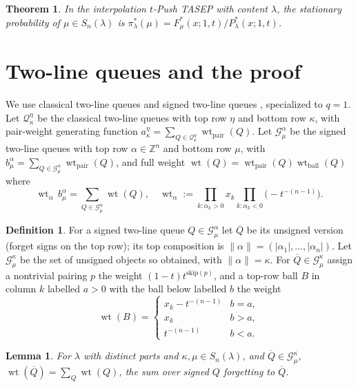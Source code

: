 \documentclass[11pt]{article}
\newcommand{\Z}{\mathbb{Z}}
\newcommand{\Snl}{S_n(\lambda)}
\newcommand{\wt}{\operatorname{wt}}
\newtheorem{theorem}{Theorem}
\newtheorem{lemma}{Lemma}
\theoremstyle{definition}
\newtheorem{definition}{Definition}
\begin{document}
\begin{theorem}\label{thm:main}
In the interpolation $t$-Push TASEP with content $\lambda$, the stationary
probability of $\mu\in\Snl$ is $\pi^*_\lambda(\mu)=F^*_\mu(x;1,t)/P^*_\lambda(x;1,t)$.
\end{theorem}

\section*{Two-line queues and the proof}

We use classical two-line queues \cite{CMW22} and signed two-line queues
\cite{BDW25a}, specialized to $q=1$. Let $\mathcal Q^\eta_\kappa$ be the classical
two-line queues with top row $\eta$ and bottom row $\kappa$, with pair-weight
generating function $a^\eta_\kappa=\sum_{Q\in\mathcal Q^\eta_\kappa}\wt_{\mathrm{pair}}(Q)$.
Let $\mathcal G^\alpha_\mu$ be the signed two-line queues with top row $\alpha\in\Z^n$
and bottom row $\mu$, with $b^\alpha_\mu=\sum_{Q\in\mathcal G^\alpha_\mu}\wt_{\mathrm{pair}}(Q)$,
and full weight $\wt(Q)=\wt_{\mathrm{pair}}(Q)\wt_{\mathrm{ball}}(Q)$ where
\begin{equation}\label{eq:wta}
\wt_\alpha\,b^\alpha_\mu=\sum_{Q\in\mathcal G^\alpha_\mu}\wt(Q),
\quad \wt_\alpha:=\prod_{k:\alpha_k>0}x_k\prod_{k:\alpha_k<0}\bigl(-t^{-(n-1)}\bigr).
\end{equation}

\begin{definition}\label{def:unsigned}
For a signed two-line queue $Q\in\mathcal G^\alpha_\mu$ let $\overline Q$ be its
unsigned version (forget signs on the top row); its top composition is
$\|\alpha\|=(|\alpha_1|,\dots,|\alpha_n|)$. Let $\mathcal G^\kappa_\mu$ be the set of
unsigned objects so obtained, with $\|\alpha\|=\kappa$. For $\overline Q\in\mathcal G^\kappa_\mu$
assign a nontrivial pairing $p$ the weight $(1-t)t^{\mathrm{skip}(p)}$, and a top-row
ball $B$ in column $k$ labelled $a>0$ with the ball below labelled $b$ the weight
\[
\wt(B)=\begin{cases}x_k-t^{-(n-1)} & b=a,\\ x_k & b>a,\\ t^{-(n-1)} & b<a.\end{cases}
\]
\end{definition}

\begin{lemma}\label{lem:signforget}
For $\lambda$ with distinct parts and $\kappa,\mu\in\Snl$, and $\overline Q\in\mathcal G^\kappa_\mu$,
$\wt(\overline Q)=\sum_Q\wt(Q)$, the sum over signed $Q$ forgetting to $\overline Q$.
\end{lemma}
\end{document}
